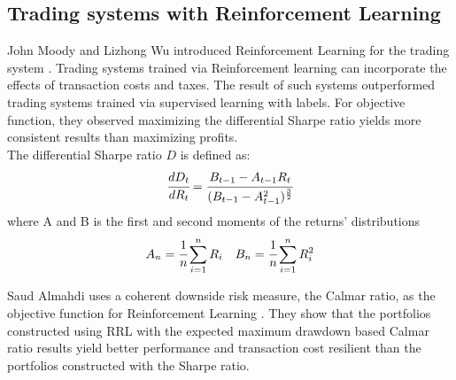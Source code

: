 \subsection{Trading systems with Reinforcement Learning}
John Moody and Lizhong Wu introduced Reinforcement Learning for the trading system \cite{618952}. Trading systems trained via Reinforcement learning can incorporate the effects of transaction costs and taxes. The result of such systems outperformed trading systems trained via supervised learning with labels. For objective function, they observed maximizing the differential Sharpe ratio yields more consistent results than maximizing profits\cite{618952,moody1998performance}.\\
The differential Sharpe ratio \(D\) is defined as:
\[
\cfrac{d D_t}{d R_t} = 
\cfrac{B_{t-1}-A_{t-1} R_t}{(B_{t-1}-A_{t-1}^2)^\frac{3}{2}}
\]
where
A and B is the first and second moments of the returns' distributions
\[ A_n = \cfrac{1}{n}\sum_{i=1}^nR_i\quad
B_n = \cfrac{1}{n}\sum_{i=1}^nR_i^2
\]

Saud Almahdi uses a coherent downside risk measure, the Calmar ratio,  as the objective function for Reinforcement Learning \cite{AdaptivePortfolioTradingSystem}. They show that the portfolios constructed using RRL with the expected maximum drawdown based Calmar ratio results yield better performance and transaction cost resilient than the portfolios constructed with the Sharpe ratio. 